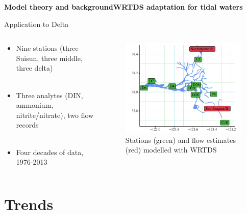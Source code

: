 \documentclass[serif]{beamer}\usepackage[]{graphicx}\usepackage[]{color}
\begin{document}
 
\begin{frame}{\textbf{Model theory and background}}{\textbf{WRTDS adaptation for tidal waters}} 
{\bf \centerline{Application to Delta}}
\begin{columns}
\begin{column}{0.45\textwidth}
\begin{itemize}
\item Nine stations (three Suisun, three middle, three delta) \\~\\
\item Three analytes (DIN, ammonium, nitrite/nitrate), two flow records \\~\\
\item Four decades of data, 1976-2013
\end{itemize}
\end{column}
\begin{column}{0.45\textwidth}
\begin{figure}
\begin{center}
\includegraphics[width = \textwidth]{fig/stations.pdf}
\caption{Stations (green) and flow estimates (red) modelled with WRTDS}
\end{center}
\end{figure}
\end{column}
\end{columns}
\end{frame}

\section{Trends}
\end{document}
